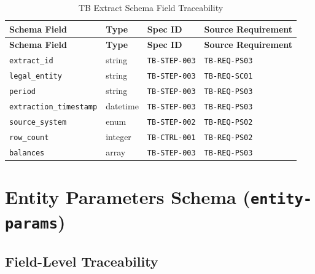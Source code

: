 \documentclass[11pt,a4paper,twoside]{report}
\newcommand{\reqref}[1]{\texttt{#1}}
\newcommand{\specref}[1]{\texttt{#1}}
\newcommand{\schemaref}[1]{\texttt{#1}}
\newcommand{\fieldref}[1]{\textcolor{sapblue}{\texttt{#1}}}
\begin{document}
\begin{longtable}{@{}L{4cm}L{2.5cm}C{2cm}L{4.5cm}@{}}
\caption{TB Extract Schema Field Traceability}
\label{tab:tb-extract-fields} \\
\toprule
\textbf{Schema Field} & \textbf{Type} & \textbf{Spec ID} & \textbf{Source Requirement} \\
\midrule
\endfirsthead
\toprule
\textbf{Schema Field} & \textbf{Type} & \textbf{Spec ID} & \textbf{Source Requirement} \\
\midrule
\endhead
\fieldref{extract\_id} & string & \specref{TB-STEP-003} & \reqref{TB-REQ-PS03} \\
\fieldref{legal\_entity} & string & \specref{TB-STEP-003} & \reqref{TB-REQ-SC01} \\
\fieldref{period} & string & \specref{TB-STEP-003} & \reqref{TB-REQ-PS03} \\
\fieldref{extraction\_timestamp} & datetime & \specref{TB-STEP-003} & \reqref{TB-REQ-PS03} \\
\fieldref{source\_system} & enum & \specref{TB-STEP-002} & \reqref{TB-REQ-PS02} \\
\fieldref{row\_count} & integer & \specref{TB-CTRL-001} & \reqref{TB-REQ-PS02} \\
\fieldref{balances} & array & \specref{TB-STEP-003} & \reqref{TB-REQ-PS03} \\
\bottomrule
\end{longtable}

\section{Entity Parameters Schema (\schemaref{entity-params})}
\label{sec:entity-params-schema}

\subsection{Field-Level Traceability}
\end{document}
